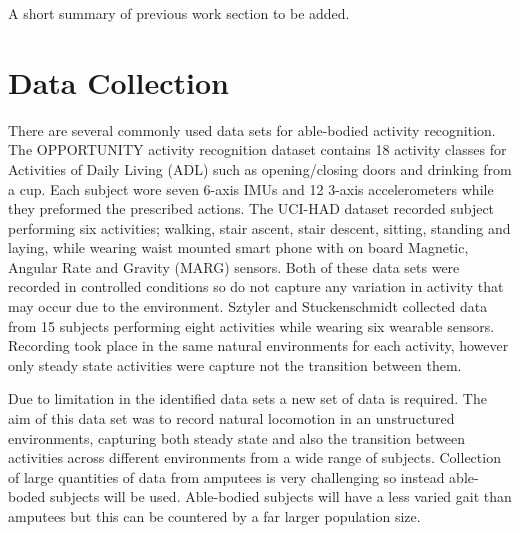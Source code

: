 \documentclass[sensors,article,submit,moreauthors,pdftex]{Definitions/mdpi}
\begin{document}
A short summary of previous work section to be added.




\section{Data Collection}
\label{sec:data_collection}
There are several commonly used data sets for able-bodied activity recognition. The OPPORTUNITY activity recognition dataset\cite{roggan2010} contains 18 activity classes for Activities of Daily Living (ADL) such as opening/closing doors and drinking from a cup. Each subject wore seven 6-axis IMUs and 12 3-axis accelerometers while they preformed the prescribed actions. The UCI-HAD dataset\cite{Anguita2013} recorded subject performing six activities; walking, stair ascent, stair descent, sitting, standing and laying, while wearing waist mounted smart phone with on board Magnetic, Angular Rate and Gravity (MARG) sensors. Both of these data sets were recorded in controlled conditions so do not capture any variation in activity that may occur due to the environment. Sztyler and Stuckenschmidt collected data from 15 subjects performing eight activities while wearing six wearable sensors. Recording took place in the same natural environments for each activity, however only steady state activities were capture not the transition between them.\cite{Sztyler2017} 

Due to limitation in the identified data sets a new set of data is required. The aim of this data set was to record natural locomotion in an unstructured environments, capturing both steady state and also the transition between activities across different environments from a wide range of subjects. Collection of large quantities of data from amputees is very challenging so instead able-boded subjects will be used. Able-bodied subjects will have a less varied gait than amputees but this can be countered by a far larger population size.
\end{document}
